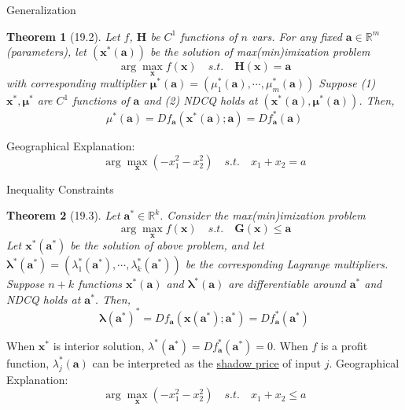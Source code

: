 \documentclass[final]{beamer}
\newtheorem{thm}{Theorem}
\newcommand{\bb}{\mathbb}
\newcommand{\bd}{\mathbf}
\begin{document}
\begin{frame}[t]{Generalization}
	\begin{thm}
		[19.2] Let $f$, $\bd{H}$ be $C^1$ functions of $n$ vars. For any fixed $\bd{a}\in\bb{R}^m$ (parameters), let $(\bd{x}^\ast(\bd{a}))$ be the solution of max(min)imization problem \[
			\arg\max_{\bd{x}} f(\bd{x})\quad s.t.\quad \bd{H}(\bd{x})=\bd{a}
		\] with corresponding multiplier $\bd{\mu}^\ast(\bd{a})=(\mu_1^\ast(\bd{a}),\cdots,\mu_m^\ast(\bd{a}))$
		Suppose (1) $\bd{x}^\ast, \bd{\mu}^\ast$ are $C^1$ functions of $\bd{a}$ and (2) NDCQ holds at $(\bd{x^\ast}(\bd{a}),\bd{\mu}^\ast(\bd{a}))$. Then, \[
			\mu^\ast(\bd{a}) = D f_{\bd{a}}(\bd{x}^\ast(\bd{a});\bd{a})
			= Df_{\bd{a}}^\ast (\bd{a})
		\]
	\end{thm}
	Geographical Explanation: \[
		\arg\max_{\bd{x}} (-x_1^2 - x_2^2) \quad s.t. \quad x_1 + x_2 = a
	\]
\end{frame}


\begin{frame}[t]{Inequality Constraints}
	\begin{thm}
		[19.3] Let $\bd{a}^\ast\in\bb{R}^k$. Consider the max(min)imization problem\[
			\arg\max_{\bd{x}}f(\bd{x}) \quad s.t.\quad \bd{G}(\bd{x})\le \bd{a}
		\]
		Let $\bd{x}^\ast(\bd{a}^\ast)$ be the solution of above problem, and let $\bd{\lambda}^\ast(\bd{a}^\ast)=(\lambda_1^\ast(\bd{a}^\ast),\cdots,\lambda_k^\ast(\bd{a}^\ast))$ be the corresponding Lagrange multipliers. Suppose $n+k$ functions $\bd{x}^\ast(\bd{a})$ and  $\bd{\lambda}^\ast(\bd{a})$ are differentiable around $\bd{a}^\ast$ and NDCQ holds at $\bd{a}^\ast$. Then, \[
			\bd{\lambda({\bd{a}^\ast})^\ast} = Df_{\bd{a}}(\bd{x}(\bd{a}^\ast);\bd{a}^\ast)=Df_{\bd{a}}^\ast(\bd{a}^\ast)
		\]
	\end{thm}
	When $\bd{x}^\ast$ is interior solution, $\lambda^\ast(\bd{a^\ast})=Df_{\bd{a}}^\ast(\bd{a^\ast})=0$. When $f$ is a profit function, $\lambda_j^\ast(\bd{a})$ can be interpreted as the \uline{shadow price} of input $j$. Geographical Explanation: \[
		\arg\max_{\bd{x}} (-x_1^2 - x_2^2) \quad s.t. \quad x_1 + x_2 \le  a
	\]
\end{frame}
\end{document}

